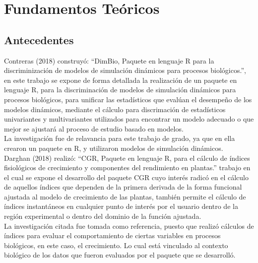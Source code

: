 \chapter{Fundamentos Te\'oricos}

\section{Antecedentes}

Contreras (2018)  construy\'o: “DimBio, Paquete en lenguaje R para la discriminizaci\'on de modelos de simulaci\'on din\'amicos para procesos biol\'ogicos.”, en este trabajo se expone de forma detallada la realizaci\'on de un paquete en lenguaje R, para la discriminaci\'on de modelos de simulaci\'on din\'amicos para procesos biol\'ogicos, para unificar las estad\'isticos que evalúan el desempeño de los modelos din\'amicos, mediante el c\'alculo para discrimaci\'on de estad\'isticos univariantes y multivariantes utilizados para encontrar un modelo adecuado o que mejor se ajustar\'a al proceso de estudio basado en modelos.\\ 

La investigaci\'on fue de relavancia para este trabajo de grado, ya que en ella crearon un paquete en R, y utilizaron modelos de simulaci\'on din\'amicos.\\

Darghan (2018) realiz\'o: “CGR, Paquete en lenguaje R, para el cálculo de índices fisiológicos de crecimiento y componentes del rendimiento en plantas.” trabajo en el cual se expone el desarrollo del paquete CGR cuyo interés radicó en el cálculo de aquellos índices que dependen de la primera derivada de la forma funcional ajustada al modelo de crecimiento de las plantas, también permite el cálculo de índices instantáneos en cualquier punto de interés por el usuario dentro de la región experimental o dentro del dominio de la función ajustada.\\

La investigaci\'on citada fue tomada como referencia, puesto que realizó cálculos de índices para evaluar el comportamiento de ciertas variables en procesos biol\'ogicos, en este caso, el crecimiento. Lo cual est\'a vinculado al contexto biol\'ogico de los datos que fueron evaluados por el paquete que se desarroll\'o.\\

